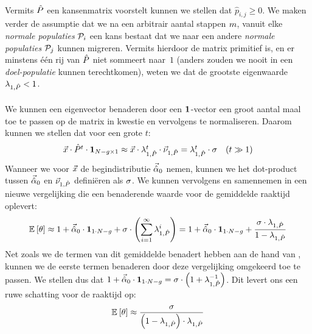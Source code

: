 \paragraph{}
Vermits $\removmat$ een kansenmatrix voorstelt kunnen we stellen dat $\hat{p}_{i,j}\geq 0$. We maken verder de assumptie dat we na een arbitrair aantal stappen $\arbitraryval$, vanuit elke \emph{normale populaties} $\calP_i$ een kans bestaat dat we naar een andere \emph{normale populaties} $\calP_j$ kunnen migreren. Vermits hierdoor de matrix primitief is, en er minstens \'e\'en rij van $\removmat$ niet sommeert naar~$1$ (anders zouden we nooit in een \emph{doel-populatie} kunnen terechtkomen), weten we dat de grootste eigenwaarde $\ev[1,\removmat]<1$.

\paragraph{}
We kunnen een eigenvector benaderen door een $\onematrix$-vector een groot aantal maal toe te passen op de matrix in kwestie en vervolgens te normaliseren. Daarom kunnen we stellen dat voor een grote $t$:
\begin{equation}
\begin{array}{cc}
\arbitraryvec\cdot\removmat^t\cdot\onematrix[\npop-\ntarpop\times1]\approx\arbitraryvec\cdot\ev[1,\removmat]^t\cdot\evr[1,\removmat]=\ev[1,\removmat]^t\cdot\metapa&\mbox{($t\gg 1$)}
\end{array}
\eqnlab{longTermAlpha}
\end{equation}
Wanneer we voor $\arbitraryvec$ de begindistributie $\probdistnormmeta{0}$ nemen, kunnen we het dot-product tussen $\probdistnormmeta{0}$ en $\evr[1,\removmat]$ defini\"eren als $\metapa$. We kunnen vervolgens  en  samennemen in een nieuwe vergelijking die een benaderende waarde voor de gemiddelde raaktijd oplevert:
\begin{equation}
\mean{\hittime}\approx 1+\probdistnormmeta{0}\cdot\onematrix[1\cdot\npop-\ntarpop]+\metapa\cdot\brak{\displaystyle\sum_{i=1}^{\infty}\ev[1,\removmat]^i}=1+\probdistnormmeta{0}\cdot\onematrix[1\cdot\npop-\ntarpop]+\displaystyle\frac{\metapa\cdot \ev[1,\removmat]}{1-\ev[1,\removmat]}
\end{equation}
Net zoals we de termen van dit gemiddelde benadert hebben aan de hand van , kunnen we de eerste termen benaderen door deze vergelijking omgekeerd toe te passen. We stellen dus dat $1+\probdistnormmeta{0}\cdot\onematrix[1\cdot\npop-\ntarpop]=\metapa\cdot\brak{1+\ev[1,\removmat]^{-1}}$. Dit levert ons een ruwe schatting voor de raaktijd op:
\begin{equation}
\mean{\hittime}\approx\displaystyle\frac{\metapa}{\brak{1-\ev[1,\removmat]}\cdot\ev[1,\removmat]}
\eqnlab{hitTimeSingle}
\end{equation}

